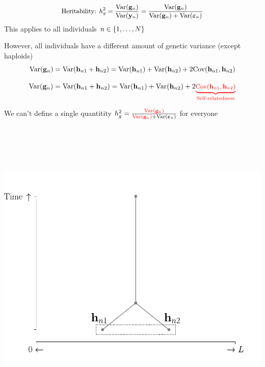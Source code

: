 \documentclass[
  letterpaper,
  DIV=11,
  numbers=noendperiod]{scrartcl}
\begin{document}
\[
\small \text{Heritability: }h_g^2 = \frac{\mathrm{Var}(\mathbf{g}_n)}{\mathrm{Var}(\mathbf{y}_n)}
=\frac{\mathrm{Var}(\mathbf{g}_n)}{\mathrm{Var}(\mathbf{g}_n)+\mathrm{Var}(\boldsymbol{\varepsilon}_n)}
\] This applies to all individuals \(\small n \in \{1,\ldots,N\}\)

However, all individuals have a different amount of genetic variance
(except haploids) \[
\small \mathrm{Var}(\mathbf{g}_n) = \mathrm{Var}(\mathbf{h}_{n1}+\mathbf{h}_{n2}) = \mathrm{Var}(\mathbf{h}_{n1}) + \mathrm{Var}(\mathbf{h}_{n2}) + 2\mathrm{Cov}(\mathbf{h}_{n1},\mathbf{h}_{n2})
\]

\[
\small \mathrm{Var}(\mathbf{g}_n) = \mathrm{Var}(\mathbf{h}_{n1}+\mathbf{h}_{n2}) = \mathrm{Var}(\mathbf{h}_{n1}) + \mathrm{Var}(\mathbf{h}_{n2}) + 2\textcolor{red}{\underbrace{\mathrm{Cov}(\mathbf{h}_{n1},\mathbf{h}_{n2})}_{\text{Self-relatedness}}}
\]

We can't define a single quantitity
\(h^2_g=\frac{\textcolor{red}{\mathrm{Var}(\mathbf{g}_n)}}{\textcolor{red}{\mathrm{Var}(\mathbf{g}_n)} + \mathrm{Var}(\boldsymbol{\varepsilon}_n)}\)
for everyone

\begin{center}
\includegraphics[width=\linewidth,height=5.72917in,keepaspectratio]{slides_files/mediabag/imgs/covariance-short-0.pdf}
\end{center}
\end{document}
